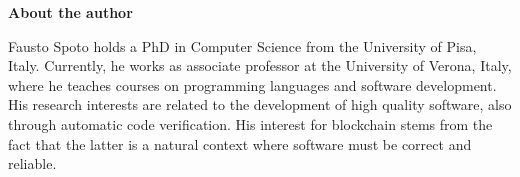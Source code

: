 \newpage

\pagestyle{empty}

\nbvspace[1]
\normalsize

\textbf{About the author}

Fausto Spoto holds a PhD in Computer Science from the University of Pisa, Italy.
Currently, he works as associate professor at the University of Verona, Italy, where
he teaches courses on programming languages and software development.
His research interests are related to the development of high quality software,
also through automatic code verification. His interest for blockchain stems
from the fact that the latter is a natural context where
software must be correct and reliable.

\nbvspace[2]
